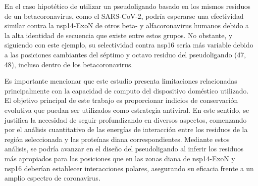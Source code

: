 En el caso hipotético de utilizar un pseudoligando basado en los mismos 
residuos de un betacoronavirus, como el SARS-CoV-2, podría esperarse una 
efectividad similar contra la nsp14-ExoN de otros beta- y alfacoronavirus 
humanos debido a la alta identidad de secuencia que existe entre estos 
grupos. No obstante, y siguiendo con este ejemplo, su selectividad contra 
nsp16 sería más variable debido a las posiciones cambiantes del séptimo y 
octavo residuo del pseudoligando (47, 48), incluso dentro de los 
betacoronavirus.

Es importante mencionar que este estudio presenta limitaciones relacionadas
principalmente con la capacidad de computo del dispositivo doméstico 
utilizado. El objetivo principal de este trabajo es proporcionar indicios de
conservación evolutiva que puedan ser utilizados como estrategia antiviral. 
En este sentido, se justifica la necesidad de seguir profundizando en 
diversos aspectos, comenzando por el análisis cuantitativo de las energías 
de interacción entre los residuos de la región seleccionada y las proteínas 
diana correspondientes. Mediante estos análisis, se podría avanzar en
el diseño del pseudoligando al inferir los residuos más apropiados para las 
posiciones que en las zonas diana de nsp14-ExoN y nsp16 deberían establecer 
interacciones polares, asegurando su eficacia frente a un amplio espectro 
de coronavirus.